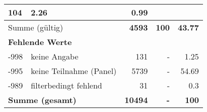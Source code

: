 \begin{longtable}{lXrrr}
       \num{104} &
       \num[round-mode=places,round-precision=2]{2.26} &
         \num[round-mode=places,round-precision=2]{0.99} \\
     \midrule
     \multicolumn{2}{l}{Summe (gültig)} &
       \textbf{\num{4593}} &
     \textbf{\num{100}} &
       \textbf{\num[round-mode=places,round-precision=2]{43.77}} \\
     \multicolumn{5}{l}{\textbf{Fehlende Werte}}\\
       -998 &
       keine Angabe &
         \num{131} &
        - &
         \num[round-mode=places,round-precision=2]{1.25} \\
       -995 &
       keine Teilnahme (Panel) &
         \num{5739} &
        - &
         \num[round-mode=places,round-precision=2]{54.69} \\
       -989 &
       filterbedingt fehlend &
         \num{31} &
        - &
         \num[round-mode=places,round-precision=2]{0.3} \\
     \midrule
     \multicolumn{2}{l}{\textbf{Summe (gesamt)}} &
          \textbf{\num{10494}} &
        \textbf{-} &
        \textbf{\num{100}} \\
     \bottomrule
     \end{longtable}
     
